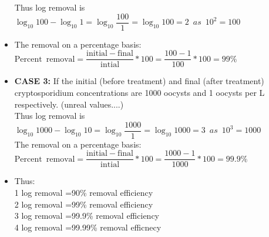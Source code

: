 \begin{itemize}
Thus log removal is $\log_{10} 100 - \log_{10} 1 = \log_{10}\dfrac{100}{1}=\log_{10} 100 = \boxed{2} \enspace as \enspace 10^2=100 $\\
\vspace{0.3cm}
\item The removal on a percentage basis: $\mathrm{Percent \enspace removal} = \dfrac{\mathrm{initial}-\mathrm{final}}{\mathrm{intial}}*100=\dfrac{100-1}{100}*100=99\%$\\
\vspace{0.5cm}
\item \textbf{CASE 3: } If the initial (before treatment) and final (after treatment) cryptosporidium concentrations are 1000 oocysts and 1 oocysts per L respectively. (unreal values....) \\
\vspace{0.3cm}
Thus log removal is $\log_{10} 1000 - \log_{10} 10 = \log_{10}\dfrac{1000}{1}=\log_{10} 1000 = \boxed{3} \enspace as \enspace 10^3=1000 $\\
\vspace{0.3cm}
The removal on a percentage basis: $\mathrm{Percent \enspace removal} = \dfrac{\mathrm{initial}-\mathrm{final}}{\mathrm{intial}}*100=\dfrac{1000-1}{1000}*100=99.9\%$
\vspace{0.3cm}
\item Thus:\\
1 log removal =90\% removal efficiency\\
2 log removal =99\% removal efficiency\\
3 log removal =99.9\% removal efficiency\\
4 log removal =99.99\% removal efficnecy\\
\end{itemize}


